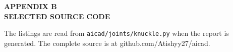 \clearpage
{}
\expandafter\gdef\csname tp@\thepage\endcsname{}
\begin{center}{\fontsize{14}{17}\selectfont\bfseries APPENDIX B\\ SELECTED SOURCE CODE}\end{center}
\singlespacing\small\noindent The listings are read from \texttt{aicad/joints/knuckle.py} when the
report is generated. The complete source is at github.com/Atishyy27/aicad.
\begingroup
\renewcommand{\lstlistingname}{Listing B.}\renewcommand{\thelstlisting}{\arabic{lstlisting}}


\endgroup
